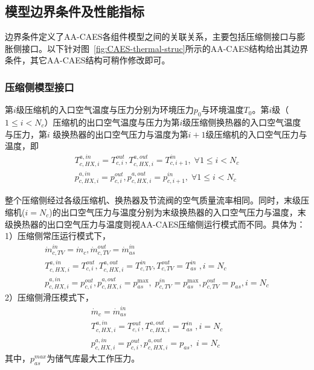 \subsection{模型边界条件及性能指标}
\label{sec:part-load-energy-boundary}
边界条件定义了AA-CAES各组件模型之间的关联关系，主要包括压缩侧接口与膨胀侧接口。以下针对图~\ref{fig:CAES-thermal-struc}所示的AA-CAES结构给出其边界条件，其它AA-CAES结构可稍作修改即可。

\subsubsection{压缩侧模型接口}
第$i$级压缩机的入口空气温度与压力分别为环境压力$p_0$与环境温度$T_0$。第$i$级（$1\le i<N_c$）压缩机的出口空气温度与压力为第$i$级压缩侧换热器的入口空气温度与压力，第$i$ 级换热器的出口空气压力与温度为第$i+1$级压缩机的入口空气压力与温度，即
\begin{subequations}
\begin{gather}
T_{c,HX,i}^{a,in} = T_{c,i}^{out},T_{c,HX,i}^{a,out} = T_{c,i + 1}^{in},\;\forall 1\le i < {N_c}\\
p_{c,HX,i}^{a,in} = p_{c,i}^{out},p_{c,HX,i}^{a,out} = p_{c,i + 1}^{in},\;\forall 1\le i < {N_c}
\end{gather}
\end{subequations}

整个压缩侧经过各级压缩机、换热器及节流阀的空气质量流率相同。同时，末级压缩机($i=N_c$)的出口空气压力与温度分别为末级换热器的入口空气压力与温度，末级换热器的出口空气压力与温度则视AA-CAES压缩侧运行模式而不同。具体为：1）压缩侧常压运行模式下，
\begin{subequations}
\begin{gather}
\dot m_{c,TV}^{in} = {{\dot m}_c},\dot m_{c,TV}^{out} = \dot m_{as}^{in}\\
T_{c,HX,i}^{a,in} = T_{c,i}^{out},T_{c,HX,i}^{a,out} = T_{c,TV}^{in},T_{c,TV}^{out} = T_{as}^{in}\;,i = {N_c}\\
p_{c,HX,i}^{a,in} = p_{c,i}^{out},p_{c,HX,i}^{a,out} = p_{as}^{\max },\;p_{c,TV}^{in} = p_{as}^{\max },p_{c,TV}^{out} = p_{as}^{},i = {N_c}
\end{gather}
\end{subequations}
2）压缩侧滑压模式下，
\begin{subequations}
\begin{gather}
{{\dot m}_c} = \dot m_{as}^{in}\\
T_{c,HX,i}^{a,in} = T_{c,i}^{out},T_{c,HX,i}^{a,out} = T_{as}^{in}\;,i = {N_c}\\
p_{c,HX,i}^{a,in} = p_{c,i}^{out},p_{c,HX,i}^{a,out} = p_{as}^{},\;i = {N_c}
\end{gather}
\end{subequations}
其中，$p_{as}^{max}$为储气库最大工作压力。

